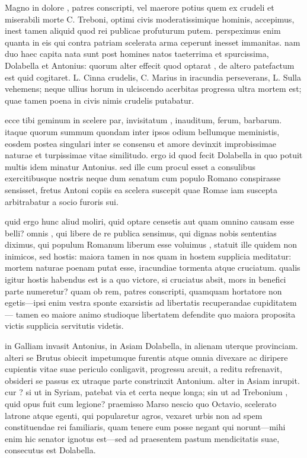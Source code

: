 
 Magno in dolore , patres conscripti, vel maerore potius quem ex crudeli et miserabili morte C. Treboni, optimi civis moderatissimique hominis, accepimus, inest tamen aliquid quod rei publicae profuturum putem. perspeximus enim quanta in eis qui contra patriam scelerata arma ceperunt inesset immanitas. nam duo haec capita nata sunt post homines natos taeterrima et spurcissima, Dolabella et Antonius: quorum alter effecit quod optarat , de altero patefactum est quid cogitaret. L. Cinna crudelis, C. Marius in iracundia perseverans, L. Sulla vehemens; neque ullius horum in ulciscendo acerbitas progressa ultra mortem est; quae tamen poena in civis nimis crudelis putabatur.

 ecce tibi geminum in scelere par, invisitatum , inauditum, ferum, barbarum. itaque quorum summum quondam inter ipsos odium bellumque meministis, eosdem postea singulari inter se consensu et amore devinxit improbissimae naturae et turpissimae vitae similitudo. ergo id quod fecit Dolabella in quo potuit multis idem minatur Antonius. sed ille cum procul esset a consulibus exercitibusque nostris neque dum senatum cum populo Romano conspirasse sensisset, fretus Antoni copiis ea scelera suscepit quae Romae iam suscepta arbitrabatur a socio furoris sui.

 quid ergo hunc aliud moliri, quid optare censetis aut quam omnino causam esse belli? omnis , qui libere de re publica sensimus, qui dignas nobis sententias diximus, qui populum Romanum liberum esse voluimus , statuit ille quidem non inimicos, sed hostis: maiora tamen in nos quam in hostem supplicia meditatur: mortem naturae poenam putat esse, iracundiae tormenta atque cruciatum. qualis igitur hostis habendus est is a quo victore, si cruciatus absit, mors in benefici parte numeretur? quam ob rem, patres conscripti, quamquam hortatore non egetis—ipsi enim vestra sponte exarsistis ad libertatis recuperandae cupiditatem— tamen eo maiore animo studioque libertatem defendite quo maiora proposita victis supplicia servitutis videtis.

 in Galliam invasit Antonius, in Asiam Dolabella, in alienam uterque provinciam. alteri se Brutus obiecit impetumque furentis atque omnia divexare ac diripere cupientis vitae suae periculo conligavit, progressu arcuit, a reditu refrenavit, obsideri se passus ex utraque parte constrinxit Antonium. alter in Asiam inrupit. cur ? si ut in Syriam, patebat via et certa neque longa; sin ut ad Trebonium , quid opus fuit cum legione? praemisso Marso nescio quo Octavio, scelerato latrone atque egenti, qui popularetur agros, vexaret urbis non ad spem constituendae rei familiaris, quam tenere eum posse negant qui norunt—mihi enim hic senator ignotus est—sed ad praesentem pastum mendicitatis suae, consecutus est Dolabella.


